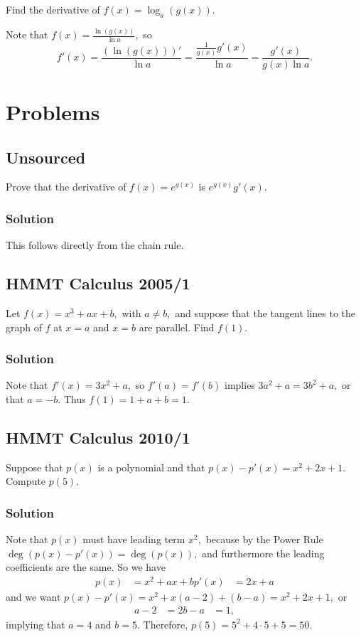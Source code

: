 \documentclass{article}
\begin{document}
\begin{exer}
Find the derivative of $f(x)=\log_a(g(x)).$
\end{exer}

\begin{sol}
Note that $f(x)=\frac{\ln(g(x))}{\ln a},$ so
\[f'(x)=\frac{(\ln(g(x)))'}{\ln a}=\frac{\frac{1}{g(x)}g'(x)}{\ln a}=\frac{g'(x)}{g(x)\ln a}.\]
\end{sol}

\pagebreak\section{Problems}

\subsection{Unsourced}

Prove that the derivative of $f(x)=e^{g(x)}$ is $e^{g(x)}g'(x).$

\subsubsection{Solution}
This follows directly from the chain rule.

\subsection{HMMT Calculus 2005/1}

Let $f(x)=x^3+ax+b,$ with $a\neq b,$ and suppose that the tangent lines to the graph of $f$ at $x=a$ and $x=b$ are parallel. Find $f(1).$

\subsubsection{Solution}
Note that $f'(x)=3x^2+a,$ so $f'(a)=f'(b)$ implies $3a^2+a=3b^2+a,$ or that $a=-b.$ Thus $f(1)=1+a+b=1.$


\subsection{HMMT Calculus 2010/1}

Suppose that $p(x)$ is a polynomial and that $p(x)-p'(x)=x^2+2x+1.$ Compute $p(5).$

\subsubsection{Solution}
Note that $p(x)$ must have leading term $x^2,$ because by the Power Rule $\deg(p(x)-p'(x))=\deg(p(x)),$ and furthermore the leading coefficients are the same. So we have
\begin{align*}
p(x)&=x^2+ax+b 
p'(x)&=2x+a
\end{align*}
and we want $p(x)-p'(x)=x^2+x(a-2)+(b-a)=x^2+2x+1,$ or
\begin{align*}
a-2&=2 
b-a&= 1,
\end{align*}
implying that $a=4$ and $b=5.$ Therefore, $p(5)=5^2+4\cdot 5+5=50.$
\end{document}
